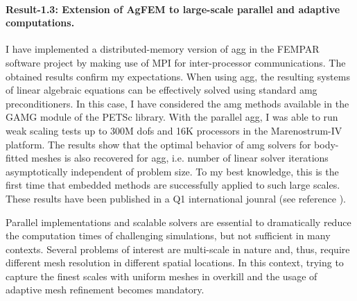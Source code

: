 \documentclass{article}
\begin{document}
\paragraph{Result-1.3: Extension of AgFEM to large-scale parallel and adaptive computations.}

I have implemented a distributed-memory version of \ac{agg} in the FEMPAR software project by making use of MPI for inter-processor communications. The obtained results confirm my expectations. When using \ac{agg}, the resulting systems of linear algebraic equations can be effectively solved using standard \ac{amg} preconditioners. In this case, I have considered the \ac{amg} methods available in the GAMG module of the PETSc library. {{With the parallel \ac{agg}, I was able to run  weak scaling tests up to  300M \acp{dof} and 16K processors in the Marenostrum-IV platform}}. The results show that the optimal behavior of \ac{amg} solvers for body-fitted meshes is also recovered for \ac{agg}, i.e. number of linear solver iterations asymptotically independent of problem size. To my best knowledge, this is the first time that embedded methods are successfully applied to such large scales. These results have been published in a { Q1 international jounral} (see reference \cite{Verdugo2019}).

Parallel implementations and scalable solvers are essential to dramatically reduce the computation times of challenging simulations, but not sufficient in many contexts. Several problems of interest are multi-scale in nature and, thus, require different mesh resolution in different spatial locations. In this context, trying to capture the finest scales with uniform meshes in overkill and the usage of adaptive mesh refinement becomes mandatory.
\end{document}
